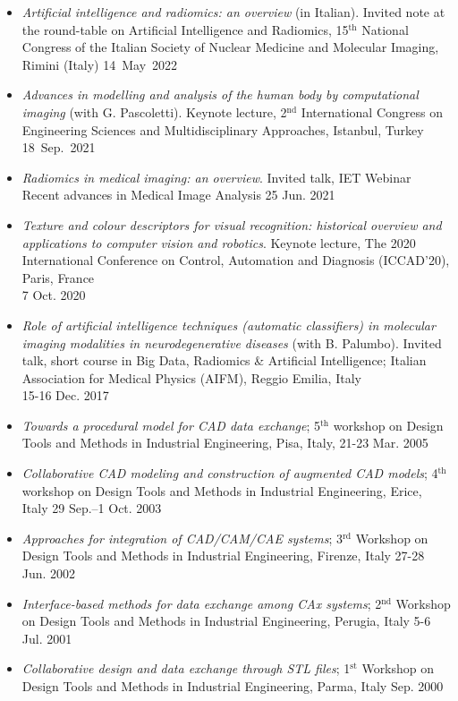 \documentclass[11pt]{article}
\begin{document}
\begin{itemize}
		\item \emph{Artificial intelligence and radiomics: an overview } (in Italian). Invited note at the round-table on Artificial Intelligence and Radiomics, 15$^\text{th}$ National Congress of the Italian Society of Nuclear Medicine and Molecular Imaging, Rimini (Italy) \hfill 14~May~2022
	\item \emph{Advances in modelling and analysis of the human body by computational imaging} (with G. Pascoletti). Keynote lecture, 2$^\text{nd}$ International Congress on Engineering Sciences and Multidisciplinary Approaches, Istanbul, Turkey \hfill 18~Sep.~2021
	\item \emph{Radiomics in medical imaging: an overview}. Invited talk, IET Webinar Recent advances in Medical Image Analysis \hfill 25 Jun. 2021
	\item \emph{Texture and colour descriptors for visual recognition: historical overview and applications to computer vision and robotics}. Keynote lecture, The 2020 International Conference on Control, Automation and Diagnosis (ICCAD’20), Paris, France \\ \mbox{} \hfill 7 Oct. 2020
	\item \emph{Role of artificial intelligence techniques (automatic classifiers) in molecular imaging modalities in neurodegenerative diseases} (with B. Palumbo). Invited talk, short course in Big Data, Radiomics \& Artificial Intelligence; Italian Association for Medical Physics (AIFM), Reggio Emilia, Italy \\ \mbox{} \hfill 15-16 Dec. 2017
	\item \emph{Towards a procedural model for CAD data exchange}; 5$^\text{th}$ workshop on Design Tools and Methods in Industrial Engineering, Pisa, Italy, \hfill 21-23 Mar. 2005
	\item \emph{Collaborative CAD modeling and construction of augmented CAD models}; 4$^\text{th}$ workshop on Design Tools and Methods in Industrial Engineering, Erice, Italy \hfill 29 Sep.--1 Oct. 2003
	\item \emph{Approaches for integration of CAD/CAM/CAE systems}; 3$^\text{rd}$ Workshop on Design Tools and Methods in Industrial Engineering, Firenze, Italy \hfill 27-28 Jun. 2002
	\item \emph{Interface-based methods for data exchange among CAx systems}; 2$^\text{nd}$ Workshop on Design Tools and Methods in Industrial Engineering, Perugia, Italy \hfill 5-6 Jul. 2001
	\item \emph{Collaborative design and data exchange through STL files}; 1$^\text{st}$ Workshop on Design Tools and Methods in Industrial Engineering, Parma, Italy \hfill Sep. 2000
\end{itemize}
\end{document}

